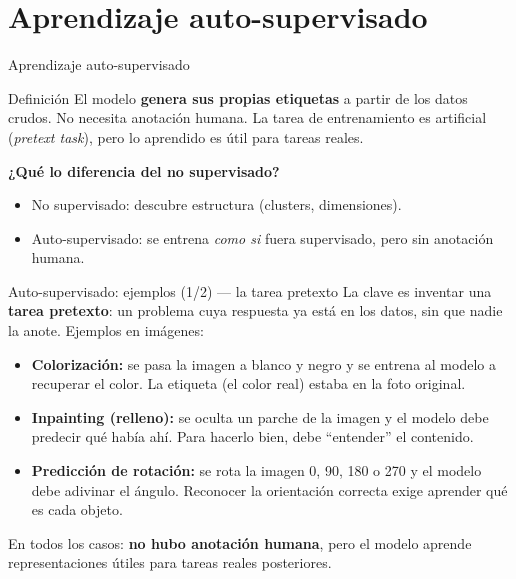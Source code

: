 \documentclass[aspectratio=169]{beamer}
\begin{document}
\section{Aprendizaje auto-supervisado}

\begin{frame}{Aprendizaje auto-supervisado}
  \begin{block}{Definición}
    El modelo \textbf{genera sus propias etiquetas} a partir de los datos crudos. No necesita anotación humana. La tarea de entrenamiento es artificial (\textit{pretext task}), pero lo aprendido es útil para tareas reales.
  \end{block}
  \bigskip
  \textbf{¿Qué lo diferencia del no supervisado?}
  \begin{itemize}
    \item No supervisado: descubre estructura (clusters, dimensiones).
    \item Auto-supervisado: se entrena \textit{como si} fuera supervisado, pero sin anotación humana.
  \end{itemize}
\end{frame}

\begin{frame}{Auto-supervisado: ejemplos (1/2) --- la tarea pretexto}
  La clave es inventar una \textbf{tarea pretexto}: un problema cuya respuesta ya está en los datos, sin que nadie la anote. Ejemplos en imágenes:
  \bigskip
  \begin{itemize}
    \item \textbf{Colorización:} se pasa la imagen a blanco y negro y se entrena al modelo a recuperar el color. La etiqueta (el color real) estaba en la foto original.
    \item \textbf{Inpainting (relleno):} se oculta un parche de la imagen y el modelo debe predecir qué había ahí. Para hacerlo bien, debe ``entender'' el contenido.
    \item \textbf{Predicción de rotación:} se rota la imagen 0\textdegree, 90\textdegree, 180\textdegree{} o 270\textdegree{} y el modelo debe adivinar el ángulo. Reconocer la orientación correcta exige aprender qué es cada objeto.
  \end{itemize}
  \bigskip
  En todos los casos: \textbf{no hubo anotación humana}, pero el modelo aprende representaciones útiles para tareas reales posteriores.
\end{frame}
\end{document}
